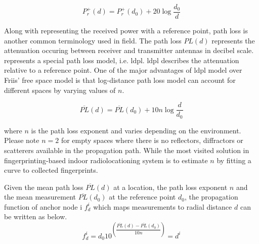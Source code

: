         \begin{equation}
            \label{eq:friisRef}
            P^{+}_r(d) = P^{+}_r(d_0) + 20 \log{\dfrac{d_0}{d}}
        \end{equation}

        Along with representing the received power with a reference point, path loss is another common terminology used in field.
        The path loss $PL(d)$ represents the attenuation occuring between receiver and transmitter antennas in decibel scale.
         represents a special path loss model, i.e. \gls{ldpl}.
        \gls{ldpl} describes the attenuation relative to a reference point.
        One of the major advantages of \gls{ldpl} model over Friis' free space model is that log-distance path loss model can account for different spaces by varying values of $n$.

        \begin{equation}
            \label{eq:log-distance}
            \overline{PL}(d) = \overline{PL}(d_0) + 10 n \log{\dfrac{d}{d_0}}
        \end{equation}

        \noindent where $n$ is the path loss exponent and varies depending on the environment.
        Please note $n = 2$ for empty spaces where there is no reflectors, diffractors or scatterers available in the propagation path.
                While the most visited solution in fingerprinting-based indoor radiolocationing system is to estimate $n$ by fitting a curve to collected fingerprints.

        Given the mean path loss $\overline{PL}(d)$ at a location, the path loss exponent $n$ and the mean measurement $\overline{PL}(d_0)$ at the reference point $d_0$, the propagation function of anchor node i $f^i_{d}$ which maps measurements to radial distance $d$ can be written as below.
        \begin{equation}
          \label{eq:log-distance-d}
          f^i_{d} = d_0 10^{\left(\dfrac{\overline{PL}(d)-\overline{PL}(d_0)}{10 n} \right)} = d^i
        \end{equation}


